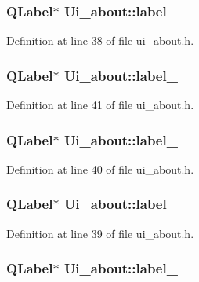 \hypertarget{classUi__about_a30c2d2ae8206508b81d75f45349bd8fc}{
\subsubsection[{label}]{\setlength{\rightskip}{0pt plus 5cm}QLabel$\ast$ {\bf Ui\_\-about::label}}}
\label{classUi__about_a30c2d2ae8206508b81d75f45349bd8fc}


Definition at line 38 of file ui\_\-about.h.

\hypertarget{classUi__about_a8387738d5bdde604124f3f117f367e74}{
\subsubsection[{label\_\-2}]{\setlength{\rightskip}{0pt plus 5cm}QLabel$\ast$ {\bf Ui\_\-about::label\_}}}
\label{classUi__about_a8387738d5bdde604124f3f117f367e74}


Definition at line 41 of file ui\_\-about.h.

\hypertarget{classUi__about_aaea79e09f696d357043c9bb49f8ca467}{
\subsubsection[{label\_\-3}]{\setlength{\rightskip}{0pt plus 5cm}QLabel$\ast$ {\bf Ui\_\-about::label\_}}}
\label{classUi__about_aaea79e09f696d357043c9bb49f8ca467}


Definition at line 40 of file ui\_\-about.h.

\hypertarget{classUi__about_ae19cfd158b2f8da605548ed66ca3e370}{
\subsubsection[{label\_\-4}]{\setlength{\rightskip}{0pt plus 5cm}QLabel$\ast$ {\bf Ui\_\-about::label\_}}}
\label{classUi__about_ae19cfd158b2f8da605548ed66ca3e370}


Definition at line 39 of file ui\_\-about.h.

\hypertarget{classUi__about_aef1b6ef4e3a01966c0e1036b3aa7f23f}{
\subsubsection[{label\_\-5}]{\setlength{\rightskip}{0pt plus 5cm}QLabel$\ast$ {\bf Ui\_\-about::label\_}}}
\label{classUi__about_aef1b6ef4e3a01966c0e1036b3aa7f23f}


